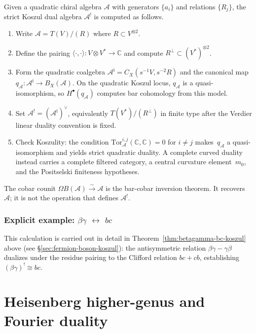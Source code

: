 \begin{remark}[Procedure]\label{rem:koszul-dual-procedure}
Given a quadratic chiral algebra $\mathcal{A}$ with generators
$\{a_i\}$ and relations $\{R_j\}$, the strict Koszul dual algebra
$\mathcal{A}^!$ is computed as follows.
\begin{enumerate}
\item Write $\mathcal{A} = T(V)/(R)$ where $R \subset V^{\otimes 2}$.
\item Define the pairing $\langle \cdot, \cdot \rangle\colon V \otimes V^* \to \mathbb{C}$ and compute $R^\perp \subset (V^*)^{\otimes 2}$.
\item Form the quadratic coalgebra
$\mathcal{A}^{\mathrm{i}}=C_X(s^{-1}V,s^{-2}R)$ and the canonical map
$q_{\mathcal A}\colon\mathcal A^{\mathrm i}\to B_X(\mathcal A)$.
On the quadratic Koszul locus, $q_{\mathcal A}$ is a quasi-isomorphism,
so $H^\bullet(q_{\mathcal A})$ computes bar cohomology from this model.
\item Set $\mathcal{A}^! = (\mathcal{A}^{\mathrm{i}})^\vee$,
equivalently $T(V^*)/(R^\perp)$ in finite type after the Verdier
linear duality convention is fixed.
\item Check Koszulity: the condition
$\mathrm{Tor}_{\mathcal{A}}^{i,j}(\mathbb{C}, \mathbb{C})=0$ for
$i\neq j$ makes~$q_{\mathcal A}$ a quasi-isomorphism and yields strict
quadratic duality. A complete curved duality instead carries a
complete filtered category, a central curvature element~$m_0$, and
the Positselski finiteness hypotheses.
\end{enumerate}
The cobar counit
$\Omega B(\mathcal{A})\xrightarrow{\sim}\mathcal{A}$ is the
bar-cobar inversion theorem. It recovers $\mathcal{A}$; it is not the
operation that defines $\mathcal{A}^!$.
\end{remark}

\subsubsection{\texorpdfstring{Explicit example: $\beta\gamma$ $\leftrightarrow$ $bc$}{Explicit example: beta-gamma bc}}

This calculation is carried out in detail in Theorem~\ref{thm:betagamma-bc-koszul} above (see \S\ref{sec:fermion-boson-koszul}): the antisymmetric relation $\beta\gamma - \gamma\beta$ dualizes under the residue pairing to the Clifford relation $bc + cb$, establishing $(\beta\gamma)^! \cong bc$.



\section{Heisenberg higher-genus and Fourier duality}
\label{sec:heisenberg-koszul}


